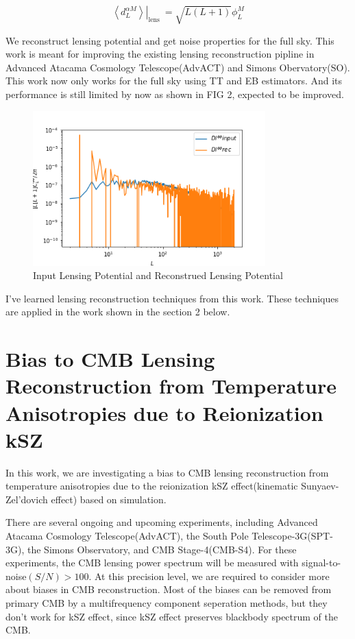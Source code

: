\documentclass[12pt, notitlepage, onecolumn, amsmath, amssymb, aps]{revtex4-1}
\begin{document}
\begin{equation}
  \left.\left\langle d_{L}^{\alpha M}\right\rangle\right|_{\text {lens }}=\sqrt{L(L+1)} \phi_{L}^{M}
\end{equation}

We reconstruct lensing potential and get noise properties for the full sky. This work is meant for improving the existing lensing reconstruction pipline in Advanced Atacama Cosmology Telescope(AdvACT) and Simons Obervatory(SO). This work now only works for the full sky using TT and EB estimators. And its performance is still limited by now as shown in FIG 2,  expected to be improved.

\begin{figure}[h]
\includegraphics[width=0.8\textwidth]{Dl_phiphi_rec.png}
\caption{Input Lensing Potential and Reconstrued Lensing Potential}
\end{figure}

I've learned lensing reconstruction techniques from this work. These techniques are applied in the work shown in the section 2 below.



\section{Bias to CMB Lensing Reconstruction from Temperature Anisotropies due to Reionization kSZ}
\label{sec:org093d799}
In this work, we are investigating a bias to CMB lensing reconstruction from temperature anisotropies due to the reionization kSZ effect(kinematic Sunyaev-Zel'dovich effect) based on simulation.

There are several ongoing and upcoming experiments, including Advanced Atacama Cosmology Telescope(AdvACT)\cite{Henderson:2015nzj}, the South Pole Telescope-3G(SPT-3G)\cite{Benson:2014qhw}, the Simons Observatory\cite{Ade:2018sbj}, and CMB Stage-4(CMB-S4)\cite{Abazajian:2016yjj}. For these experiments, the CMB lensing power spectrum will be measured with signal-to-noise\((S/N)>100\). At this precision level, we are required to consider more about biases in CMB reconstruction. Most of the biases can be removed from primary CMB by a multifrequency component seperation methods, but they don't work for kSZ effect, since kSZ effect preserves blackbody spectrum of the CMB.\cite{Smith:2009pn}
\end{document}
